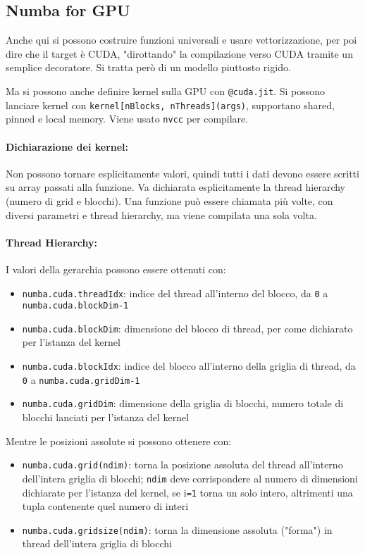 \subsection{Numba for GPU}

Anche qui si possono costruire funzioni universali e usare vettorizzazione, per poi dire che il target è CUDA, "dirottando" la compilazione verso CUDA tramite un semplice decoratore. Si tratta però di un modello piuttosto rigido.

Ma si possono anche definire kernel sulla GPU con \texttt{@cuda.jit}. Si possono lanciare kernel con \texttt{kernel[nBlocks, nThreads](args)}, supportano shared, pinned e local memory. Viene usato \texttt{nvcc} per compilare.

\paragraph{Dichiarazione dei kernel:} Non possono tornare esplicitamente valori, quindi tutti i dati devono essere scritti su array passati alla funzione. Va dichiarata esplicitamente la thread hierarchy (numero di grid e blocchi). Una funzione può essere chiamata più volte, con diversi parametri e thread hierarchy, ma viene compilata una sola volta.

\paragraph{Thread Hierarchy:} I valori della gerarchia possono essere ottenuti con: 
\begin{itemize}
	\item \texttt{numba.cuda.threadIdx}: indice del thread all'interno del blocco, da \texttt{0} a \texttt{numba.cuda.blockDim-1}
	
	\item \texttt{numba.cuda.blockDim}: dimensione del blocco di thread, per come dichiarato per l'istanza del kernel 
	
	\item \texttt{numba.cuda.blockIdx}: indice del blocco all'interno della griglia di thread, da \texttt{0} a \texttt{numba.cuda.gridDim-1}
	
	\item \texttt{numba.cuda.gridDim}: dimensione della griglia di blocchi, numero totale di blocchi lanciati per l'istanza del kernel
\end{itemize}

Mentre le posizioni assolute si possono ottenere con: 
\begin{itemize}
	\item \texttt{numba.cuda.grid(ndim)}: torna la posizione assoluta del thread all'interno dell'intera griglia di blocchi; \texttt{ndim} deve corrispondere al numero di dimensioni dichiarate per l'istanza del kernel, se i\texttt{=1} torna un solo intero, altrimenti una tupla contenente quel numero di interi
	
	\item \texttt{numba.cuda.gridsize(ndim)}: torna la dimensione assoluta ("forma") in thread dell'intera griglia di blocchi
\end{itemize}

